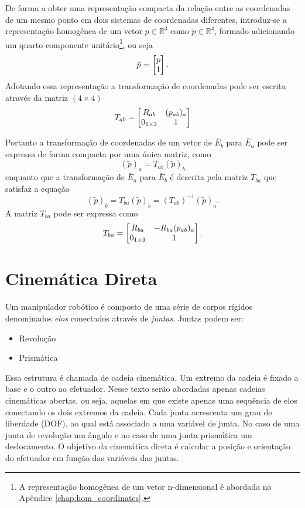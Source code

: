 De forma a obter uma representação compacta da relação entre as coordenadas de um mesmo ponto em dois sistemas de coordenadas diferentes, introduz-se a representação homogênea de um vetor $p \in \mathbb{R}^3$ como $\tilde{p} \in \mathbb{R}^4$, formado adicionando um quarto componente unitário\footnote{A representação homogênea de um vetor n-dimensional é abordada no Apêndice \ref{chap:hom_coordinates}.}, ou seja
\begin{equation}
\tilde{p} = \begin{bmatrix}p \\ 1\end{bmatrix}.
\end{equation}  
Adotando essa representação a transformação de coordenadas pode ser escrita através da matriz $(4 \times 4) $
\begin{equation}
T_{ab} = \begin{bmatrix}
    R_{ab} & (p_{ab})_a \\
    0_{1 \times 3} & 1
\end{bmatrix}
\end{equation}

Portanto a transformação de coordenadas de um vetor de $\bar{E}_b$ para $\bar{E}_a$ pode ser expressa de forma compacta por uma única matriz, como
\begin{equation}
(\tilde{p})_a = T_{ab} (\tilde{p})_b
\end{equation}
enquanto que a transformação de $\bar{E}_a$ para $\bar{E}_b$ é descrita pela matriz $T_{ba}$ que satisfaz a equação
\begin{equation}
(\tilde{p})_b = T_{ba} (\tilde{p})_b = (T_{ab})^{-1} (\tilde{p})_a .
\end{equation}
A matriz $T_{ba}$ pode ser expressa como
\begin{equation}
T_{ba} = \begin{bmatrix}
    R_{ba} & -R_{ba}(p_{ab})_a \\
    0_{1 \times 3} & 1
\end{bmatrix}.
\end{equation}

\section{Cinemática Direta}
Um manipulador robótico é composto de uma série de corpos rígidos denominados \textit{elos} conectados através de \textit{juntas}. 
Juntas podem ser:
\begin{itemize} 
\item Revolução
\item Prismática
\end{itemize}

Essa estrutura é chamada de cadeia cinemática.
Um extremo da cadeia é fixado a base e o outro ao efetuador.
Nesse texto serão abordadas apenas cadeias cinemáticas abertas, ou seja, aquelas em que existe apenas uma sequência de elos conectando os dois extremos da cadeia.
Cada junta acrescenta um grau de liberdade (DOF), ao qual está associado a uma variável de junta. No caso de uma junta de revolução um ângulo e no caso de uma junta prismática um deslocamento.
O objetivo da cinemática direta é calcular a posição e orientação do efetuador em função das variáveis das juntas.

